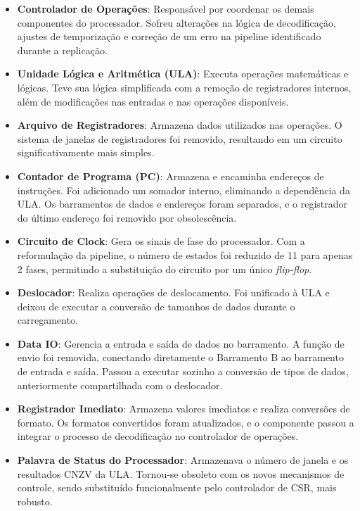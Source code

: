 \documentclass[
	12pt,				%
	openright,			%
	oneside,			%
	a4paper,			%
	english,			%
	french,				%
	spanish,			%
	brazil,				%
	]{abntex2}
\begin{document}
\begin{itemize}
    \item \textbf{Controlador de Operações}: Responsável por coordenar os demais componentes do processador. Sofreu alterações na lógica de decodificação, ajustes de temporização e correção de um erro na pipeline identificado durante a replicação.

    \item \textbf{Unidade Lógica e Aritmética (ULA)}: Executa operações matemáticas e lógicas. Teve sua lógica simplificada com a remoção de registradores internos, além de modificações nas entradas e nas operações disponíveis.

    \item \textbf{Arquivo de Registradores}: Armazena dados utilizados nas operações. O sistema de janelas de registradores foi removido, resultando em um circuito significativamente mais simples.

    \item \textbf{Contador de Programa (PC)}: Armazena e encaminha endereços de instruções. Foi adicionado um somador interno, eliminando a dependência da ULA. Os barramentos de dados e endereços foram separados, e o registrador do último endereço foi removido por obsolescência.

    \item \textbf{Circuito de Clock}: Gera os sinais de fase do processador. Com a reformulação da pipeline, o número de estados foi reduzido de 11 para apenas 2 fases, permitindo a substituição do circuito por um único \textit{flip-flop}.

    \item \textbf{Deslocador}: Realiza operações de deslocamento. Foi unificado à ULA e deixou de executar a conversão de tamanhos de dados durante o carregamento.

    \item \textbf{Data IO}: Gerencia a entrada e saída de dados no barramento. A função de envio foi removida, conectando diretamente o Barramento B ao barramento de entrada e saída. Passou a executar sozinho a conversão de tipos de dados, anteriormente compartilhada com o deslocador.

    \item \textbf{Registrador Imediato}: Armazena valores imediatos e realiza conversões de formato. Os formatos convertidos foram atualizados, e o componente passou a integrar o processo de decodificação no controlador de operações.

    \item \textbf{Palavra de Status do Processador}: Armazenava o número de janela e os resultados CNZV da ULA. Tornou-se obsoleto com os novos mecanismos de controle, sendo substituído funcionalmente pelo controlador de CSR, mais robusto.


\end{itemize}
\end{document}
